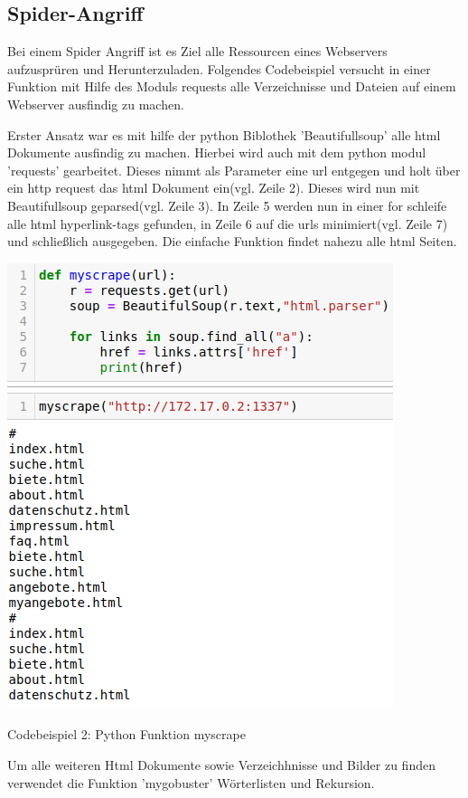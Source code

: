 \documentclass[12pt]{article}
\begin{document}
\subsection{Spider-Angriff}
Bei einem Spider Angriff ist es Ziel alle Ressourcen eines Webservers aufzusprüren und Herunterzuladen.
Folgendes Codebeispiel versucht in einer Funktion mit Hilfe des Moduls requests alle Verzeichnisse und Dateien auf einem Webserver ausfindig zu machen.

Erster Ansatz war es mit hilfe der python Biblothek 'Beautifullsoup' alle html Dokumente ausfindig zu machen.
Hierbei wird auch mit dem python modul 'requests' gearbeitet. Dieses nimmt als Parameter eine url entgegen und holt über ein http request das html Dokument ein(vgl. Zeile 2). Dieses wird nun mit Beautifullsoup geparsed(vgl. Zeile 3). In Zeile 5 werden nun in einer for schleife alle html hyperlink-tags gefunden, in Zeile 6 auf die urls minimiert(vgl. Zeile 7) und schließlich ausgegeben. Die einfache Funktion findet nahezu alle html Seiten.
\begin{center}
 \includegraphics[scale=0.5]{data/scrapemy.png}
\end{center}
\begin{center}
 Codebeispiel 2: Python Funktion myscrape
\end{center}
\newpage
Um alle weiteren Html Dokumente sowie Verzeichhnisse und Bilder zu finden verwendet die Funktion 'mygobuster' Wörterlisten und Rekursion.
\end{document}
